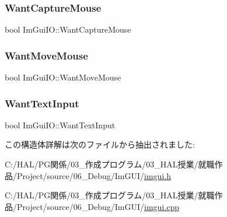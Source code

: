 \mbox{\label{struct_im_gui_i_o_af5b8add76c5d833a65df19b5456acd7e}} 
\subsubsection{\texorpdfstring{Want\+Capture\+Mouse}{WantCaptureMouse}}
{\footnotesize\ttfamily bool Im\+Gui\+I\+O\+::\+Want\+Capture\+Mouse}

\mbox{\label{struct_im_gui_i_o_a0bd366ca18e78bf58f674a355189eaf3}} 
\subsubsection{\texorpdfstring{Want\+Move\+Mouse}{WantMoveMouse}}
{\footnotesize\ttfamily bool Im\+Gui\+I\+O\+::\+Want\+Move\+Mouse}

\mbox{\label{struct_im_gui_i_o_a0e53197e96187a57b2d86720bf163f4d}} 
\subsubsection{\texorpdfstring{Want\+Text\+Input}{WantTextInput}}
{\footnotesize\ttfamily bool Im\+Gui\+I\+O\+::\+Want\+Text\+Input}



この構造体詳解は次のファイルから抽出されました\+:\begin{DoxyCompactItemize}
\item 
C\+:/\+H\+A\+L/\+P\+G関係/03\+\_\+作成プログラム/03\+\_\+\+H\+A\+L授業/就職作品/\+Project/source/06\+\_\+\+Debug/\+Im\+G\+U\+I/\mbox{\hyperlink{imgui_8h}{imgui.\+h}}\item 
C\+:/\+H\+A\+L/\+P\+G関係/03\+\_\+作成プログラム/03\+\_\+\+H\+A\+L授業/就職作品/\+Project/source/06\+\_\+\+Debug/\+Im\+G\+U\+I/\mbox{\hyperlink{imgui_8cpp}{imgui.\+cpp}}\end{DoxyCompactItemize}
